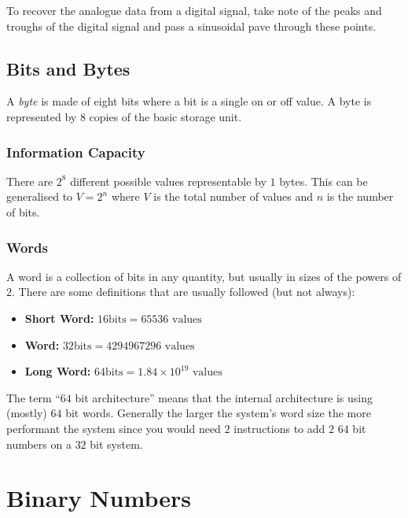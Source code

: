 \begin{note}
	To recover the analogue data from a digital signal, take note of the peaks and troughs of the digital signal and pass a sinusoidal pave through these points.
\end{note}

\subsection{Bits and Bytes}\label{sub:bits_and_bytes}

A \emph{byte} is made of eight bits where a bit is a single on or off value.
A byte is represented by \(8\) copies of the basic storage unit.

\subsubsection{Information Capacity}\label{ssub:information_capacity}

There are \(2^8\) different possible values representable by \(1\) bytes.
This can be generalised to \(V=2^{n}\) where \(V\) is the total number of values and \(n\) is the number of bits.

\subsubsection{Words}\label{ssub:words}

A word is a collection of bits in any quantity, but usually in sizes of the powers of \(2\).
There are some definitions that are usually followed (but not always):

\begin{itemize}
	\item \textbf{Short Word:} \(16 \textrm{bits} = 65536 \textrm{ values}\)
	\item \textbf{Word:} \(32 \textrm{bits} = 4294967296 \textrm{ values}\)
	\item \textbf{Long Word:} \(64 \textrm{bits} = 1.84 \times 10^{19} \textrm{ values}\)
\end{itemize}
The term ``\(64\) bit architecture'' means that the internal architecture is using (mostly) \(64\) bit words.
Generally the larger the system's word size the more performant the system since you would need \(2\) instructions to add \(2\) \(64\) bit numbers on a \(32\) bit system.

\section{Binary Numbers}\label{sec:binary_numbers}


